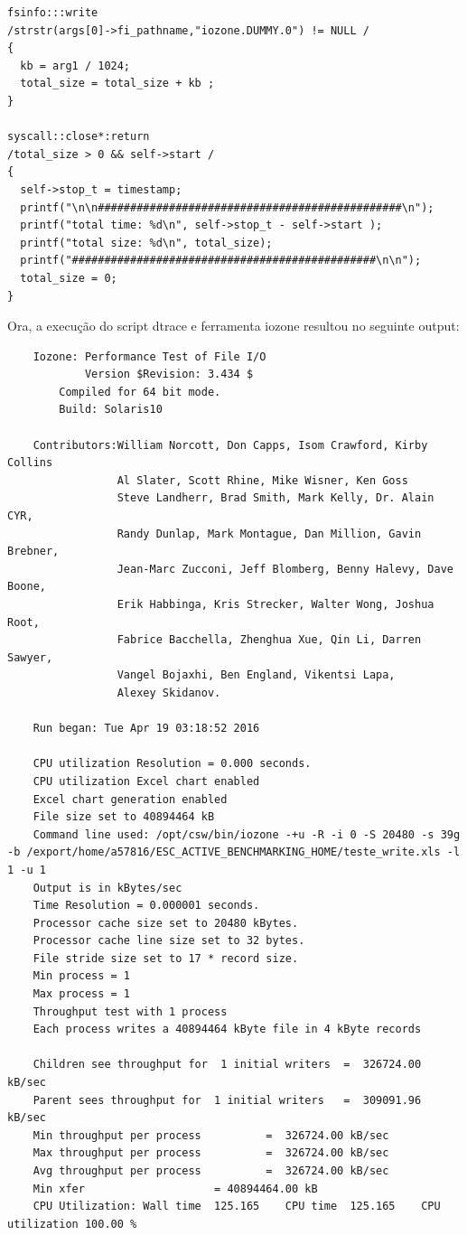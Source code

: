 \documentclass[a4paper]{article}
\begin{document}
{\begin{lstlisting}
fsinfo:::write 
/strstr(args[0]->fi_pathname,"iozone.DUMMY.0") != NULL /
{
  kb = arg1 / 1024;
  total_size = total_size + kb ; 
}

syscall::close*:return
/total_size > 0 && self->start /
{
  self->stop_t = timestamp; 
  printf("\n\n###############################################\n");
  printf("total time: %d\n", self->stop_t - self->start );
  printf("total size: %d\n", total_size);
  printf("###############################################\n\n");
  total_size = 0;
}
\end{lstlisting}

Ora, a execução do script dtrace e ferramenta iozone resultou no seguinte output:

\begin{lstlisting}
	Iozone: Performance Test of File I/O
	        Version $Revision: 3.434 $
		Compiled for 64 bit mode.
		Build: Solaris10 

	Contributors:William Norcott, Don Capps, Isom Crawford, Kirby Collins
	             Al Slater, Scott Rhine, Mike Wisner, Ken Goss
	             Steve Landherr, Brad Smith, Mark Kelly, Dr. Alain CYR,
	             Randy Dunlap, Mark Montague, Dan Million, Gavin Brebner,
	             Jean-Marc Zucconi, Jeff Blomberg, Benny Halevy, Dave Boone,
	             Erik Habbinga, Kris Strecker, Walter Wong, Joshua Root,
	             Fabrice Bacchella, Zhenghua Xue, Qin Li, Darren Sawyer,
	             Vangel Bojaxhi, Ben England, Vikentsi Lapa,
	             Alexey Skidanov.

	Run began: Tue Apr 19 03:18:52 2016

	CPU utilization Resolution = 0.000 seconds.
	CPU utilization Excel chart enabled
	Excel chart generation enabled
	File size set to 40894464 kB
	Command line used: /opt/csw/bin/iozone -+u -R -i 0 -S 20480 -s 39g -b /export/home/a57816/ESC_ACTIVE_BENCHMARKING_HOME/teste_write.xls -l 1 -u 1
	Output is in kBytes/sec
	Time Resolution = 0.000001 seconds.
	Processor cache size set to 20480 kBytes.
	Processor cache line size set to 32 bytes.
	File stride size set to 17 * record size.
	Min process = 1 
	Max process = 1 
	Throughput test with 1 process
	Each process writes a 40894464 kByte file in 4 kByte records

	Children see throughput for  1 initial writers 	=  326724.00 kB/sec
	Parent sees throughput for  1 initial writers 	=  309091.96 kB/sec
	Min throughput per process 			=  326724.00 kB/sec 
	Max throughput per process 			=  326724.00 kB/sec
	Avg throughput per process 			=  326724.00 kB/sec
	Min xfer 					= 40894464.00 kB
	CPU Utilization: Wall time  125.165    CPU time  125.165    CPU utilization 100.00 %




\end{lstlisting}}
\end{document}
